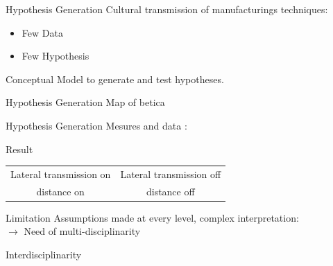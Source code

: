 \documentclass[12pt, notes=show]{beamer}
\begin{document}
\begin{frame}{Hypothesis Generation}
    Cultural transmission of manufacturings techniques:
    \begin{itemize}
	\item Few Data
	\item Few Hypothesis 
    \end{itemize}
    Conceptual Model to generate and test hypotheses.
    
\end{frame}
\begin{frame}{Hypothesis Generation}
    Map of betica
    
\end{frame}
\begin{frame}{Hypothesis Generation}
    Mesures and data :
    
\end{frame}

\begin{frame}{Result}
    \begin{tabular}{cc}
	Lateral transmission on &
	Lateral transmission off \\
	distance on &
	distance off \\ 
    \end{tabular}

\end{frame}


\begin{frame}{Limitation}
    Assumptions made at every level, complex interpretation:\\
    \hfil $\rightarrow$ Need of multi-disciplinarity
\end{frame}

\begin{frame}
    \begin{center}
	\Huge
	Interdisciplinarity
    \end{center}
\end{frame}
\end{document}
